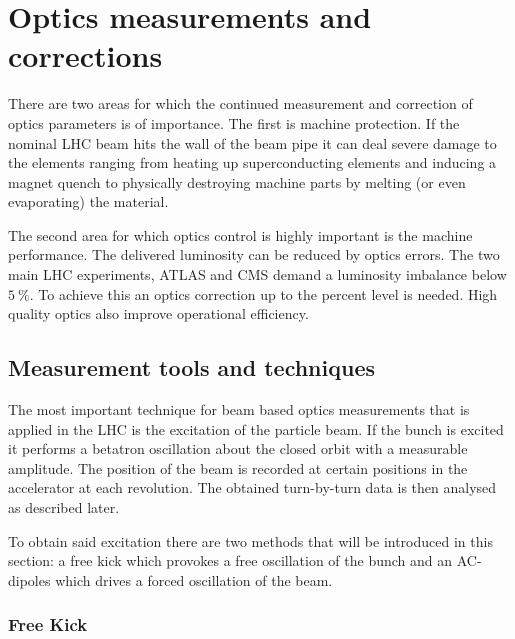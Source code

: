 \section{Optics measurements and corrections}

There are two areas for which the continued measurement and correction of optics parameters is of
importance. The first is machine protection. If the nominal LHC beam hits the wall of the beam pipe
it can deal severe damage to the elements ranging from heating up superconducting elements and
inducing a magnet quench to physically destroying machine parts by melting (or even evaporating) the
material.

The second area for which  optics control is highly important is the machine performance.
The delivered luminosity can be reduced by optics errors.
The two main LHC experiments, ATLAS and CMS demand a luminosity imbalance below $\SI{5}{\percent}$.
To achieve this an optics correction up to the percent level is needed.
High quality optics also improve operational efficiency.

\subsection{Measurement tools and techniques}

The most important technique for beam based optics measurements that is applied in the LHC is the excitation
of the particle beam.
If the bunch is excited it performs a betatron oscillation about the closed orbit with a measurable amplitude.
The position of the beam is recorded at certain positions in the accelerator at each revolution. The
obtained turn-by-turn data is then analysed as described later.

To obtain said excitation there are two methods that will be introduced in this section: a free kick
which provokes a free oscillation of the bunch and an AC-dipoles which drives a forced oscillation of
the beam. 

\subsubsection{Free Kick}

